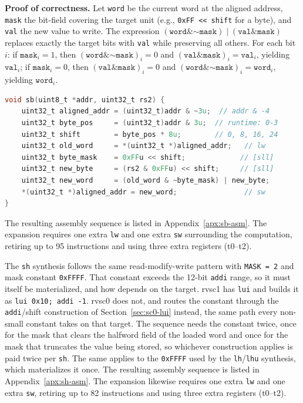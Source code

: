 \textbf{Proof of correctness.} Let \texttt{word} be the current word at the aligned address,
\texttt{mask} the bit-field covering the target unit (e.g., \texttt{0xFF << shift} for a byte), and
\texttt{val} the new value to write. The expression $(\mathtt{word} \mathbin{\&} \mathord{\sim}
\mathtt{mask}) \mid (\mathtt{val} \mathbin{\&} \mathtt{mask})$ replaces exactly the target bits with
\texttt{val} while preserving all others. For each bit $i$: if $\mathtt{mask}_i = 1$, then
$(\mathtt{word} \mathbin{\&} \mathord{\sim}\mathtt{mask})_i = 0$ and $(\mathtt{val} \mathbin{\&}
\mathtt{mask})_i = \mathtt{val}_i$, yielding $\mathtt{val}_i$; if $\mathtt{mask}_i = 0$, then
$(\mathtt{val} \mathbin{\&} \mathtt{mask})_i = 0$ and $(\mathtt{word} \mathbin{\&}
\mathord{\sim}\mathtt{mask})_i = \mathtt{word}_i$, yielding $\mathtt{word}_i$.

\begin{lstlisting}[language=C]
void sb(uint8_t *addr, uint32_t rs2) {
    uint32_t aligned_addr = (uint32_t)addr & ~3u;  // addr & -4
    uint32_t byte_pos     = (uint32_t)addr & 3u;  // runtime: 0-3
    uint32_t shift        = byte_pos * 8u;        // 0, 8, 16, 24
    uint32_t old_word     = *(uint32_t *)aligned_addr;   // lw
    uint32_t byte_mask    = 0xFFu << shift;             // [sll]
    uint32_t new_byte     = (rs2 & 0xFFu) << shift;     // [sll]
    uint32_t new_word     = (old_word & ~byte_mask) | new_byte;
    *(uint32_t *)aligned_addr = new_word;                // sw
}
\end{lstlisting}

The resulting assembly sequence is listed in Appendix~\ref{apx:sb-asm}. The expansion requires one
extra \texttt{lw} and one extra \texttt{sw} surrounding the computation, retiring up to 95
instructions and using three extra registers (t0--t2).

The \texttt{sh} synthesis follows the same read-modify-write pattern with \texttt{MASK = 2} and mask
constant \texttt{0xFFFF}. That constant exceeds the 12-bit \texttt{addi} range, so it must itself be
materialized, and how depends on the target. rvsc1 has \texttt{lui} and builds it as
\texttt{lui 0x10; addi -1}. rvsc0 does not, and routes the constant through the \texttt{addi}/shift
construction of Section~\ref{sec:sc0-lui} instead, the same path every non-small constant takes on
that target. The sequence needs the constant twice, once for the mask that clears the halfword field
of the loaded word and once for the mask that truncates the value being stored, so whichever
construction applies is paid twice per \texttt{sh}. The same applies to the \texttt{0xFFFF} used by
the \texttt{lh}/\texttt{lhu} synthesis, which materializes it once. The resulting assembly sequence is
listed in Appendix~\ref{apx:sh-asm}. The expansion likewise requires one extra \texttt{lw} and one
extra \texttt{sw}, retiring up to 82 instructions and using three extra registers (t0--t2).

